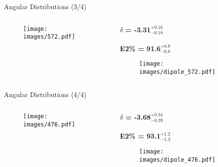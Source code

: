\documentclass [aspectratio=169]{beamer}
\begin{document}
\begin{frame}{Angular Distributions (3/4)}
\begin{columns}[c]
\begin{column}{0.6\textwidth}
\begin{center}
\begin{figure}
\texttt{[image: images/572.pdf]}
\end{figure}
\end{center}
\end{column}
\begin{column}{0.4\textwidth}
\begin{center}
\textbf{$\delta$ = -3.31$^{{+{0.16}}}_{{-{0.18}}}$ \\~\\
E2\% = 91.6$^{{+{0.8}}}_{{-{0.8}}}$}
\begin{figure}
\texttt{[image: images/dipole\_572.pdf]}
\end{figure}
\end{center}
\end{column}
\end{columns}
\end{frame}

\begin{frame}{Angular Distributions (4/4)}
\begin{columns}[c]
\begin{column}{0.6\textwidth}
\begin{center}
\begin{figure}
\texttt{[image: images/476.pdf]}
\end{figure}
\end{center}
\end{column}
\begin{column}{0.4\textwidth}
\begin{center}
\textbf{$\delta$ = -3.68$^{{+{0.34}}}_{{-{0.39}}}$ \\~\\
E2\% = 93.1$^{{+{1.2}}}_{{-{1.3}}}$}
\begin{figure}
\texttt{[image: images/dipole\_476.pdf]}
\end{figure}
\end{center}
\end{column}
\end{columns}
\end{frame}
\end{document}

